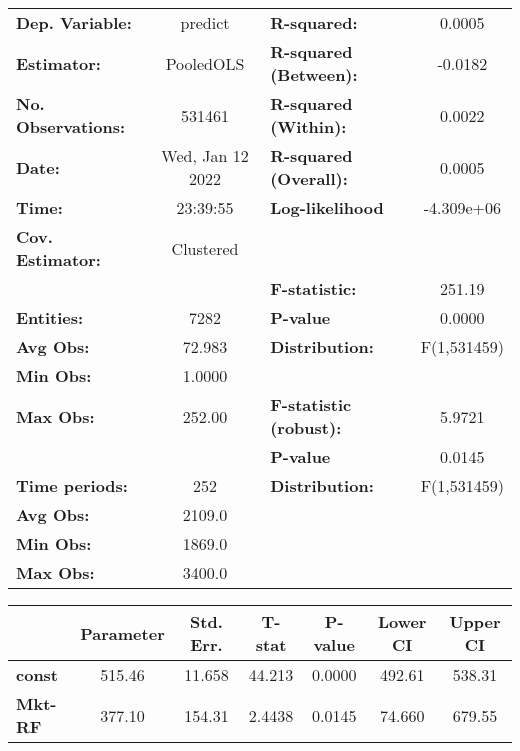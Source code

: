 \begin{center}
\begin{tabular}{lclc}
\toprule
\textbf{Dep. Variable:}    &      predict       & \textbf{  R-squared:         }   &      0.0005      \\
\textbf{Estimator:}        &     PooledOLS      & \textbf{  R-squared (Between):}  &     -0.0182      \\
\textbf{No. Observations:} &       531461       & \textbf{  R-squared (Within):}   &      0.0022      \\
\textbf{Date:}             &  Wed, Jan 12 2022  & \textbf{  R-squared (Overall):}  &      0.0005      \\
\textbf{Time:}             &      23:39:55      & \textbf{  Log-likelihood     }   &    -4.309e+06    \\
\textbf{Cov. Estimator:}   &     Clustered      & \textbf{                     }   &                  \\
\textbf{}                  &                    & \textbf{  F-statistic:       }   &      251.19      \\
\textbf{Entities:}         &        7282        & \textbf{  P-value            }   &      0.0000      \\
\textbf{Avg Obs:}          &       72.983       & \textbf{  Distribution:      }   &   F(1,531459)    \\
\textbf{Min Obs:}          &       1.0000       & \textbf{                     }   &                  \\
\textbf{Max Obs:}          &       252.00       & \textbf{  F-statistic (robust):} &      5.9721      \\
\textbf{}                  &                    & \textbf{  P-value            }   &      0.0145      \\
\textbf{Time periods:}     &        252         & \textbf{  Distribution:      }   &   F(1,531459)    \\
\textbf{Avg Obs:}          &       2109.0       & \textbf{                     }   &                  \\
\textbf{Min Obs:}          &       1869.0       & \textbf{                     }   &                  \\
\textbf{Max Obs:}          &       3400.0       & \textbf{                     }   &                  \\
\bottomrule
\end{tabular}
\begin{tabular}{lcccccc}
                & \textbf{Parameter} & \textbf{Std. Err.} & \textbf{T-stat} & \textbf{P-value} & \textbf{Lower CI} & \textbf{Upper CI}  \\
\midrule
\textbf{const}  &       515.46       &       11.658       &      44.213     &      0.0000      &       492.61      &       538.31       \\
\textbf{Mkt-RF} &       377.10       &       154.31       &      2.4438     &      0.0145      &       74.660      &       679.55       \\
\bottomrule
\end{tabular}
\end{center}
